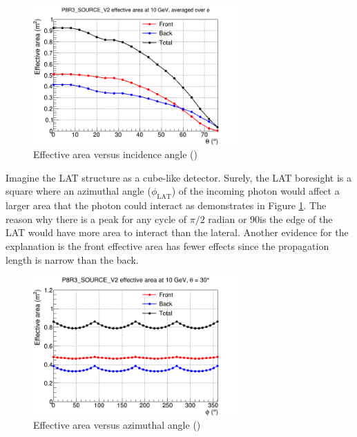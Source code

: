 \begin{figure}[h!]
    \centering
    \includegraphics[width=0.7\textwidth]{content/background/figures/eff_theta.png}
    \caption{Effective area versus incidence angle (\cite{lat_p8_performance})}
    \label{fig:eff_theta}
\end{figure}

Imagine the LAT structure as a cube-like detector. Surely, the LAT 
boresight is a square where an azimuthal angle ($\phi_\text{LAT}$) of the incoming 
photon would affect a larger area that the photon could interact 
as demonstrates in Figure \ref{fig:eff_theta}. The reason why there 
is a peak for any cycle of $\pi/2$ radian or 90\textdegree is 
the edge of the LAT would have more area to interact than the 
lateral. Another evidence for the explanation is the front effective 
area has fewer effects since the propagation length is narrow than 
the back.

\begin{figure}[h!]
    \centering
    \includegraphics[width=0.7\textwidth]{content/background/figures/eff_phi.png}
    \caption{Effective area versus azimuthal angle (\cite{lat_p8_performance})}
    \label{fig:eff_phi}
\end{figure}

